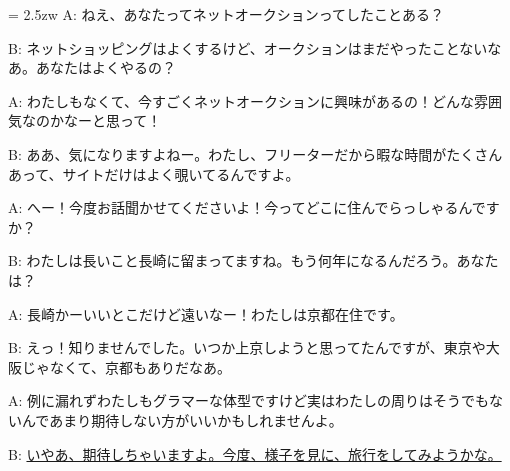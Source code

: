 \documentclass[11pt]{amsart}
\title{}
\author{}
\newenvironment{hangall}[1]{\hangindent = 2.5zw\everypar{\hangindent = 2.5zw}}{}
\begin{document}
\maketitle
\begin{hangall}{}%
A: ねえ、あなたってネットオークションってしたことある？

B: ネットショッピングはよくするけど、オークションはまだやったことないなあ。あなたはよくやるの？

A: わたしもなくて、今すごくネットオークションに興味があるの！どんな雰囲気なのかなーと思って！

B: ああ、気になりますよねー。わたし、フリーターだから暇な時間がたくさんあって、サイトだけはよく覗いてるんですよ。

A: へー！今度お話聞かせてくださいよ！今ってどこに住んでらっしゃるんですか？

B: わたしは長いこと長崎に留まってますね。もう何年になるんだろう。あなたは？

A: 長崎かーいいとこだけど遠いなー！わたしは京都在住です。

B: えっ！知りませんでした。いつか上京しようと思ってたんですが、東京や大阪じゃなくて、京都もありだなあ。

A: 例に漏れずわたしもグラマーな体型ですけど実はわたしの周りはそうでもないんであまり期待しない方がいいかもしれませんよ。

B: \ul{いやあ、期待しちゃいますよ。今度、様子を見に、旅行をしてみようかな。}\end{hangall}
\end{document}
